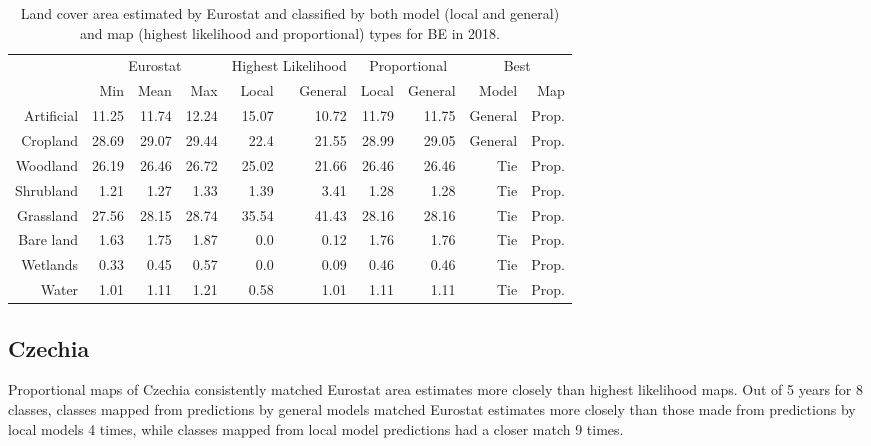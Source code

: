 \begin{table}[H]
\centering
\caption{Land cover area estimated by Eurostat and classified by both model (local and general) and map (highest likelihood and proportional) types for BE in 2018.}

\begin{tabular}{r|rrr|rr|rr|rr}
\toprule
{} & \multicolumn{3}{|c}{Eurostat} & \multicolumn{2}{|c}{Highest Likelihood} & \multicolumn{2}{|c}{Proportional} & \multicolumn{2}{|c}{Best} \\
{} &      Min &   Mean &    Max &              Local & General &        Local & General &    Model &    Map \\
\midrule
Artificial &    11.25 &  11.74 &  12.24 &              15.07 &   10.72 &        11.79 &   11.75 &  General &  Prop. \\
Cropland   &    28.69 &  29.07 &  29.44 &               22.4 &   21.55 &        28.99 &   29.05 &  General &  Prop. \\
Woodland   &    26.19 &  26.46 &  26.72 &              25.02 &   21.66 &        26.46 &   26.46 &      Tie &  Prop. \\
Shrubland  &     1.21 &   1.27 &   1.33 &               1.39 &    3.41 &         1.28 &    1.28 &      Tie &  Prop. \\
Grassland  &    27.56 &  28.15 &  28.74 &              35.54 &   41.43 &        28.16 &   28.16 &      Tie &  Prop. \\
Bare land  &     1.63 &   1.75 &   1.87 &                0.0 &    0.12 &         1.76 &    1.76 &      Tie &  Prop. \\
Wetlands   &     0.33 &   0.45 &   0.57 &                0.0 &    0.09 &         0.46 &    0.46 &      Tie &  Prop. \\
Water      &     1.01 &   1.11 &   1.21 &               0.58 &    1.01 &         1.11 &    1.11 &      Tie &  Prop. \\
\bottomrule
\end{tabular}
\end{table}

\subsection{Czechia}
Proportional maps of Czechia consistently matched Eurostat area estimates more closely than highest likelihood maps. Out of 5 years for 8 classes, classes mapped from predictions by general models matched Eurostat estimates more closely than those made from predictions by local models 4 times, while classes mapped from local model predictions had a closer match 9 times.

